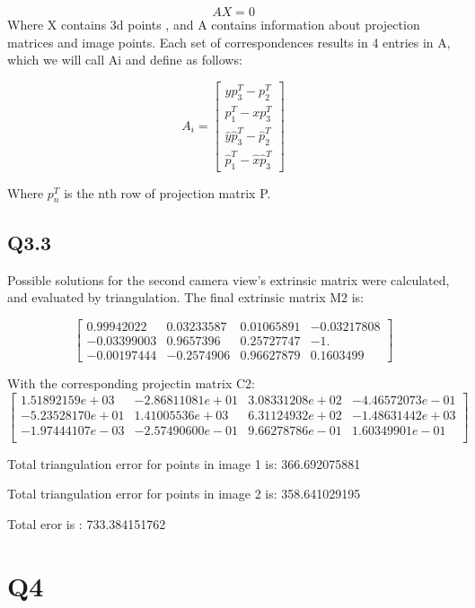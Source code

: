 \documentclass[12pt]{article}
\begin{document}
$$
AX = 0
$$
Where X contains 3d points , and A contains information about projection matrices and image points. Each set of correspondences results in 4 entries in A, which we will call Ai and define as follows:

$$
A_{i} = 
\begin{bmatrix}
y p_{3}^{T} - p_{2}^{T} \\
p_{1}^{T} - x p_{3}^{T} \\
\hat{y} \hat{p}_{3}^{T} - \hat{p}_{2}^{T} \\
\hat{p}_{1}^{T} - \hat{x} \hat{p}_{3}^{T} 
\end{bmatrix}
$$
  
Where $p_{n}^{T}$ is the nth row of projection matrix P.

\newpage
\subsection{Q3.3}
Possible solutions for the second camera view's extrinsic matrix were calculated, and evaluated by triangulation.
The final extrinsic matrix M2 is:
  
$$
\begin{bmatrix}
0.99942022& 0.03233587& 0.01065891& -0.03217808 \\
-0.03399003& 0.9657396& 0.25727747& -1.         \\
-0.00197444& -0.2574906& 0.96627879& 0.1603499
\end{bmatrix}
$$
  
With the corresponding projectin matrix C2:
$$
\begin{bmatrix}
1.51892159e+03& -2.86811081e+01& 3.08331208e+02& -4.46572073e-01 \\
-5.23528170e+01& 1.41005536e+03& 6.31124932e+02& -1.48631442e+03 \\
-1.97444107e-03& -2.57490600e-01& 9.66278786e-01& 1.60349901e-01 \\
\end{bmatrix}
$$
  
Total triangulation error for points in image 1 is: 366.692075881  
  
Total triangulation error for points in image 2 is: 358.641029195  
  
Total eror is : 733.384151762  
  

\newpage
\section{Q4}
\end{document}
